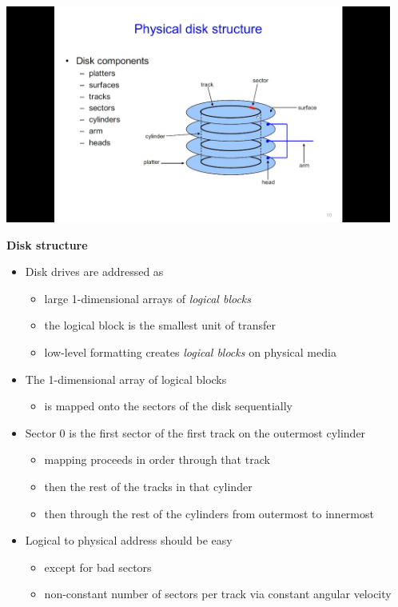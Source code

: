 \documentclass[11pt,a4paper]{article}
\begin{document}
\includegraphics[height=270]{physical-disk-structure.jpg}

\textbf{Disk structure}
\begin{itemize}
    \item Disk drives are addressed as
        \begin{itemize}
            \item large 1-dimensional arrays of \emph{logical blocks}
            \item the logical block is the smallest unit of transfer
            \item low-level formatting creates \emph{logical blocks} on physical media
        \end{itemize}
    \item The 1-dimensional array of logical blocks
        \begin{itemize}
            \item is mapped onto the sectors of the disk sequentially
        \end{itemize}
    \item Sector 0 is the first sector of the first track on the outermost cylinder
        \begin{itemize}
            \item mapping proceeds in order through that track
            \item then the rest of the tracks in that cylinder
            \item then through the rest of the cylinders from outermost to innermost
        \end{itemize}
    \item Logical to physical address should be easy
        \begin{itemize}
            \item except for bad sectors
            \item non-constant number of sectors per track via constant angular velocity
        \end{itemize}
\end{itemize}
\end{document}
